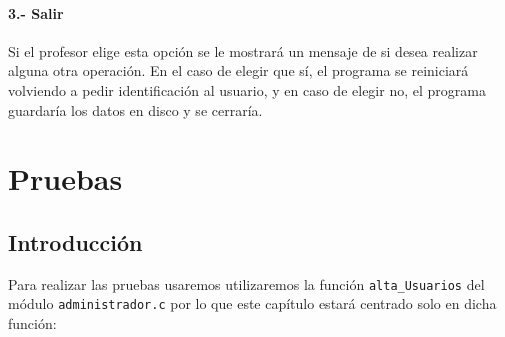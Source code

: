 \documentclass{book}
\begin{document}
\subsubsection{3.- Salir}{
Si el profesor elige esta opción se le mostrará un mensaje de si desea realizar alguna otra operación. En el caso de elegir que sí, el programa se reiniciará volviendo a pedir identificación al usuario, y en caso de elegir no, el programa guardaría los datos en disco y se cerraría.
}


\chapter{Pruebas}
\section{Introducción}
Para realizar las pruebas usaremos utilizaremos la función \texttt{alta\_Usuarios} del módulo \texttt{administrador.c} por lo que este capítulo estará centrado solo en dicha función:\\
\end{document}
